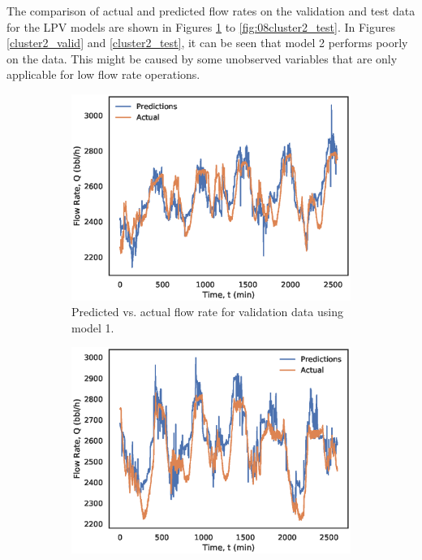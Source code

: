 The comparison of actual and predicted flow rates on the validation and test data for the LPV models are shown in Figures \ref{fig:08cluster1_valid} to \ref{fig:08cluster2_test}. In Figures \ref{cluster2_valid} and \ref{cluster2_test}, it can be seen that model 2 performs poorly on the data.  This might be caused by some unobserved variables that are only applicable for low flow rate operations.
\begin{figure}[h]
    \centering
     \begin{subfigure}[b]{0.48\textwidth}
         \includegraphics[width=\textwidth]{images/08cluster1_valid.eps}
         \caption{Predicted vs. actual flow rate for validation data using model 1.}
         \label{fig:08cluster1_valid}
     \end{subfigure}
     \begin{subfigure}[b]{0.48\textwidth}
         \includegraphics[width=\textwidth]{images/08cluster1_test.eps}

\end{subfigure}
\end{figure}
